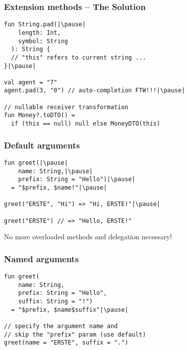 \begin{frame}[fragile] \frametitle{Extension methods -- The Solution}
\pause
\begin{lstlisting}
fun String.pad(|\pause|
    length: Int,
    symbol: String
  ): String {
  // "this" refers to current string ...
}|\pause|

val agent = "7"
agent.pad(3, "0") // auto-completion FTW!!!|\pause|

// nullable receiver transformation
fun Money?.toDTO() =
  if (this == null) null else MoneyDTO(this)
\end{lstlisting}
\end{frame}



\begin{frame}[fragile] \frametitle{Default arguments}
\pause
\begin{lstlisting}
fun greet(|\pause|
    name: String,|\pause|
    prefix: String = "Hello")|\pause|
  = "$prefix, $name!"|\pause|

greet("ERSTE", "Hi") => "Hi, ERSTE!"|\pause|

greet("ERSTE") // => "Hello, ERSTE!"
\end{lstlisting}

No more overloaded methods and delegation necessary!
\end{frame}


\begin{frame}[fragile] \frametitle{Named arguments}
\pause
\begin{lstlisting}
fun greet(
    name: String,
    prefix: String = "Hello",
    suffix: String = "!")
  = "$prefix, $name$suffix"|\pause|

// specify the argument name and
// skip the "prefix" param (use default)
greet(name = "ERSTE", suffix = ".")
\end{lstlisting}
\end{frame}


